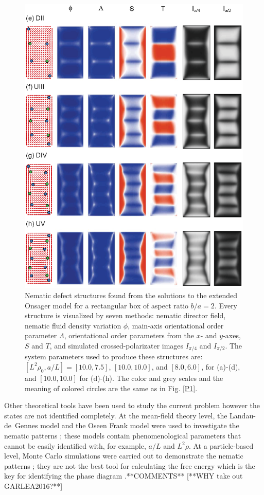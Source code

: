 \documentclass[prl,twocolumn,preprintnumbers,reprint]{revtex4}
\begin{document}
\begin{figure}[!t]
\begin{center}
\includegraphics[width = 1\columnwidth]{eps/layer-stCh.eps}
\caption{Nematic defect structures found from the solutions to the extended Onsager model for a rectangular box of aspect ratio $b/a=2$. Every structure is visualized by seven methods: nematic director field, nematic fluid density variation $\phi$, main-axis orientational order parameter $\Lambda$, orientational order parameters from the $x$- and $y$-axes, $S$ and $T$, and simulated crossed-polarizater images $I_{\pi/4}$ and $I_{\pi/2}$. The system parameters used to produce these structures are: $[L^2 \rho_0, a/L]  = [10.0, 7.5]$, $[10.0, 10.0]$, and $[8.0, 6.0]$, for (a)-(d), and $[10.0, 10.0]$ for (d)-(h). The color and grey scales and the meaning of colored circles are the same as in Fig. \ref{P1}.}\label{P4}
\end{center}\end{figure}

Other theoretical tools have been used to study the current problem however the states are not identified completely. At the mean-field theory level, the Landau-de~Gennes model and the Oseen Frank model were used
to investigate the nematic patterns \cite{Tsakonas2007,Galanis2010,Luo2012,Lewis2014}; these models contain phenomenological parameters that cannot be easily identified with, for example, $a/L$ and $L^2\rho$. At a particle-based level,  Monte Carlo simulations were carried out to demonstrate the nematic patterns \cite{delasHeras2009,Dzubiella2000,Geigenfein2015,Mulder2015,Garlea2016}; they are not the best tool for calculating the free energy which is the key for identifying the phase diagram  .**COMMENTS** [**WHY take out GARLEA2016?**]
\end{document}
